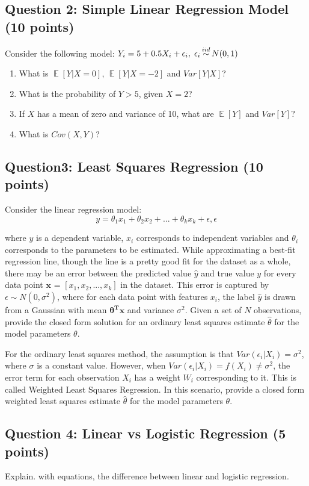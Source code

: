 \documentclass{article}
\DeclareMathOperator{\E}{\mathbb{E}}
\newcommand\iidsim{\stackrel{\mathclap{iid}}{\sim}}
\begin{document}
\subsection*{Question 2: 
Simple Linear Regression Model (10 points)}

Consider the following model: $Y_{i} = 5 + 0.5X_{i} + \epsilon_{i}, \hspace{1mm} \epsilon_{i} \iidsim N(0,1)$

\begin{enumerate}
    \item What is $\E[Y|X = 0]$, $\E[Y|X = -2]$ and $Var[Y|X]$?
    \item What is the probability of $Y > 5$, given $X = 2$?
    \item If $X$ has a mean of zero and variance of 10, what are $\E[Y]$ and $Var[Y]$?
    \item What is $Cov(X,Y)$?
\end{enumerate}

\subsection*{Question3: Least Squares Regression (10 points)}

Consider the linear regression model: 
\begin{equation}
    y = \theta_{1}x_{1} + \theta_{2}x_{2} + ... + \theta_{k}x_{k} + \epsilon, \epsilon
\end{equation}

where $y$ is a dependent variable, $x_{i}$ corresponds to independent variables and $\theta_{i}$ corresponds to the parameters to be estimated. While approximating a best-fit regression line, though the line is a pretty good fit for the dataset as a whole, there may be an error between the predicted value $\hat y$ and true value $y$ for every data point $\textbf{x}$ = $[x_{1}, x_{2}, ..., x_{k}]$ in the dataset. This error is captured by $\epsilon \sim N(0, \sigma^2)$, where for each data point with features $x_{i}$, the label $\hat y$ is drawn from a Gaussian with mean $\mathbf{\theta^{T}x}$ and variance $\sigma^2$. Given a set of $N$ observations, provide the closed form solution for an ordinary least squares estimate $\hat\theta$ for the model parameters $\theta$.

For the ordinary least squares method, the assumption is that $Var(\epsilon_{i}|X_{i}) = \sigma^{2}$, where $\sigma$ is a constant value. However, when $Var(\epsilon_{i}|X_{i}) = f(X_{i}) \neq \sigma^{2}$, the error term for each observation $X_{i}$ has a weight $W_{i}$ corresponding to it. This is called Weighted Least Squares Regression. In this scenario, provide a closed form  weighted least squares estimate $\hat\theta$ for the model parameters $\theta$.

\subsection*{Question 4: Linear vs Logistic Regression (5 points)}
Explain. with equations, the difference between linear and logistic regression.
\end{document}
